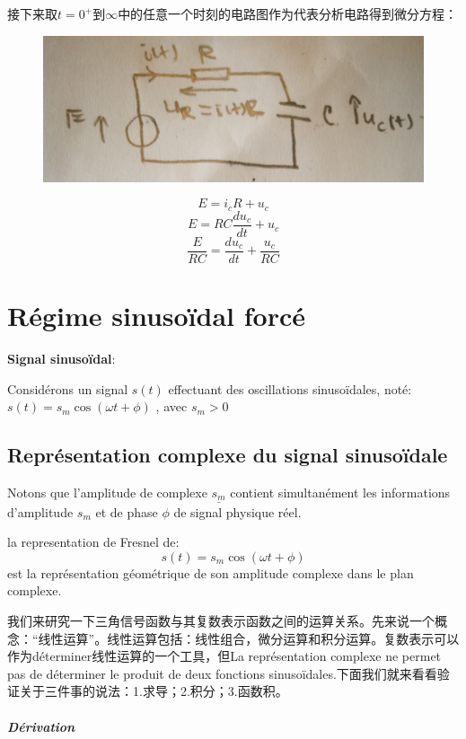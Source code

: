 \documentclass[12pt]{book}
\theoremstyle{definition}\newtheorem{dfn}{Définition}[chapter]
\theoremstyle{plain}\newtheorem{thm}{Théorème}[chapter]
\theoremstyle{plain}\newtheorem{prp}{Proposition}[chapter]
\theoremstyle{plain}\newtheorem{lem}{\bf Lemme}[chapter]
\theoremstyle{plain}\newtheorem{axm}{\bf Axiome}[chapter]
\theoremstyle{plain}\newtheorem{lmm}{\bf Lemme}[chapter]
\theoremstyle{plain}\newtheorem{cor}{\bf Corollaire}[chapter]
\theoremstyle{remark}\newtheorem{rem}{Remarque}[chapter]
\begin{document}
接下来取$t=0^+$到$\infty$中的任意一个时刻的电路图作为代表分析电路得到微分方程：
\begin{figure}[H]
	\centering
		\includegraphics[scale=0.1]{Circuit lineaire du premier ordre//3}
\end{figure}


	$$E = i_cR+u_c$$
	$$E = RC\frac{du_c}{dt}+u_c$$
	$$
	\frac{E}{RC}= \frac{du_c}{dt}+\frac{u_c}{RC}
	$$

\chapter{Régime
	sinusoïdal forcé}

\textbf{Signal sinusoïdal}:

Considérons un signal $s(t)$ effectuant des oscillations sinusoïdales, noté: $s(t)=s_m\cos(\omega t+\phi)$
, avec $s_m>0$


\section{Représentation complexe du signal sinusoïdale}
Notons que l'amplitude de complexe $\underline{s_m}$ contient simultanément les informations
d'amplitude
$s_m$ et de phase $\phi$
de signal physique réel.

la representation de Fresnel de:$$
s(t)=s_m\cos(\omega t+\phi)
$$
est la représentation géométrique de son {\color{red}amplitude complexe} dans
le plan complexe.

我们来研究一下三角信号函数与其复数表示函数之间的运算关系。先来说一个概念：“线性运算”。线性运算包括：线性组合，微分运算和积分运算。复数表示可以作为déterminer线性运算的一个工具，但La représentation complexe ne
permet pas de déterminer le produit
de deux fonctions sinusoïdales.下面我们就来看看验证关于三件事的说法：1.求导；2.积分；3.函数积。

\paragraph{Dérivation}
\end{document}
